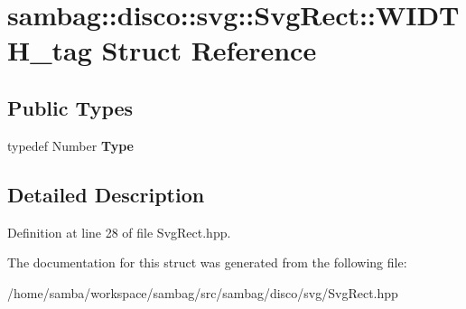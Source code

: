 \hypertarget{structsambag_1_1disco_1_1svg_1_1_svg_rect_1_1_w_i_d_t_h__tag}{
\section{sambag::disco::svg::SvgRect::WIDTH\_\-tag Struct Reference}
\label{structsambag_1_1disco_1_1svg_1_1_svg_rect_1_1_w_i_d_t_h__tag}
}
\subsection*{Public Types}
\begin{DoxyCompactItemize}
\item 
\hypertarget{structsambag_1_1disco_1_1svg_1_1_svg_rect_1_1_w_i_d_t_h__tag_acd340385d4aaca2bf015edb751d585cd}{
typedef Number {\bfseries Type}}
\label{structsambag_1_1disco_1_1svg_1_1_svg_rect_1_1_w_i_d_t_h__tag_acd340385d4aaca2bf015edb751d585cd}

\end{DoxyCompactItemize}


\subsection{Detailed Description}


Definition at line 28 of file SvgRect.hpp.



The documentation for this struct was generated from the following file:\begin{DoxyCompactItemize}
\item 
/home/samba/workspace/sambag/src/sambag/disco/svg/SvgRect.hpp\end{DoxyCompactItemize}
